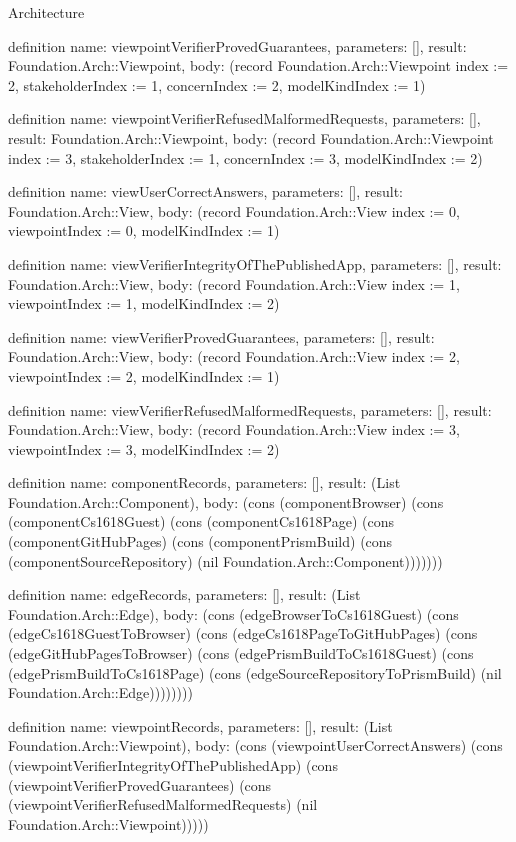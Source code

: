 \begin{lexlean}{Architecture}
\begin{semanticmodule}
definition{
  name: viewpointVerifierProvedGuarantees,
  parameters: [],
  result: Foundation.Arch::Viewpoint,
  body: (record Foundation.Arch::Viewpoint {index := 2, stakeholderIndex := 1, concernIndex := 2, modelKindIndex := 1})
}

definition{
  name: viewpointVerifierRefusedMalformedRequests,
  parameters: [],
  result: Foundation.Arch::Viewpoint,
  body: (record Foundation.Arch::Viewpoint {index := 3, stakeholderIndex := 1, concernIndex := 3, modelKindIndex := 2})
}

definition{
  name: viewUserCorrectAnswers,
  parameters: [],
  result: Foundation.Arch::View,
  body: (record Foundation.Arch::View {index := 0, viewpointIndex := 0, modelKindIndex := 1})
}

definition{
  name: viewVerifierIntegrityOfThePublishedApp,
  parameters: [],
  result: Foundation.Arch::View,
  body: (record Foundation.Arch::View {index := 1, viewpointIndex := 1, modelKindIndex := 2})
}

definition{
  name: viewVerifierProvedGuarantees,
  parameters: [],
  result: Foundation.Arch::View,
  body: (record Foundation.Arch::View {index := 2, viewpointIndex := 2, modelKindIndex := 1})
}

definition{
  name: viewVerifierRefusedMalformedRequests,
  parameters: [],
  result: Foundation.Arch::View,
  body: (record Foundation.Arch::View {index := 3, viewpointIndex := 3, modelKindIndex := 2})
}

definition{
  name: componentRecords,
  parameters: [],
  result: (List Foundation.Arch::Component),
  body: (cons (componentBrowser) (cons (componentCs1618Guest) (cons (componentCs1618Page) (cons (componentGitHubPages) (cons (componentPrismBuild) (cons (componentSourceRepository) (nil Foundation.Arch::Component)))))))
}

definition{
  name: edgeRecords,
  parameters: [],
  result: (List Foundation.Arch::Edge),
  body: (cons (edgeBrowserToCs1618Guest) (cons (edgeCs1618GuestToBrowser) (cons (edgeCs1618PageToGitHubPages) (cons (edgeGitHubPagesToBrowser) (cons (edgePrismBuildToCs1618Guest) (cons (edgePrismBuildToCs1618Page) (cons (edgeSourceRepositoryToPrismBuild) (nil Foundation.Arch::Edge))))))))
}

definition{
  name: viewpointRecords,
  parameters: [],
  result: (List Foundation.Arch::Viewpoint),
  body: (cons (viewpointUserCorrectAnswers) (cons (viewpointVerifierIntegrityOfThePublishedApp) (cons (viewpointVerifierProvedGuarantees) (cons (viewpointVerifierRefusedMalformedRequests) (nil Foundation.Arch::Viewpoint)))))
}


\end{semanticmodule}
\end{lexlean}
